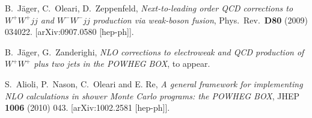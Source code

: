 \documentclass[a4paper,11pt]{article}
\begin{document}
%
\begin{thebibliography}{99}
 B.~J\"ager, C.~Oleari, D.~Zeppenfeld, {\em
    Next-to-leading order QCD corrections to $W^+W^+jj$ and $W^-W^-jj$
    production via weak-boson fusion}, Phys.\ Rev.\ {\bf D80 } (2009)
  034022.  [arXiv:0907.0580 [hep-ph]].

 B.~J\"ager, G.~Zanderighi, {\em NLO corrections to
    electroweak and QCD production of $W^+W^+$ plus two jets in the
    POWHEG BOX}, to appear.
  
 S.~Alioli, P.~Nason, C.~Oleari and E. Re, {\em
    A general framework for implementing NLO calculations in shower
    Monte Carlo programs: the POWHEG BOX}, JHEP {\bf 1006 } (2010)
  043.  [arXiv:1002.2581 [hep-ph]].

\end{thebibliography}
\end{document}
